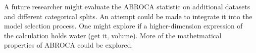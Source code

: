 \documentclass{article}
\begin{document}
        A future researcher might evaluate the ABROCA statistic on additional datasets and different categorical splits.
        An attempt could be made to integrate it into the model selection process.
        One might explore if a higher-dimension expression of the calculation holds water (get it, volume).
        More of the mathetmatical properties of ABROCA could be explored.



        
        
    
\end{document}
